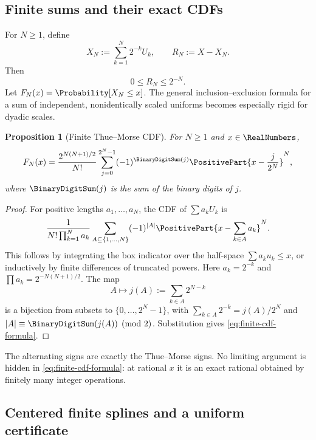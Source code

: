 \documentclass[11pt,oneside]{article}
\newtheorem{proposition}[theorem]{Proposition}
\theoremstyle{definition}
\theoremstyle{remark}
\numberwithin{equation}{section}
\begin{document}
\subsection{Finite sums and their exact CDFs}

For $N\ge1$, define
\begin{equation}\label{eq:finite-random-sum}
 X_N:=\sum_{k=1}^{N}2^{-k}U_k,
 \qquad
 R_N:=X-X_N.
\end{equation}
Then
\begin{equation}\label{eq:tail-bound}
 0\le R_N\le2^{-N}.
\end{equation}
Let $F_N(x)=\Probability[X_N\le x]$.  The general inclusion--exclusion formula for a
sum of independent, nonidentically scaled uniforms becomes especially rigid
for dyadic scales.

\begin{proposition}[Finite Thue--Morse CDF]\label{prop:finite-cdf}
For $N\ge1$ and $x\in\RealNumbers$,
\begin{equation}\label{eq:finite-cdf-formula}
 F_N(x)=
 \frac{2^{N(N+1)/2}}{N!}
 \sum_{j=0}^{2^N-1}(-1)^{\BinaryDigitSum(j)}
 \PositivePart{x-\frac{j}{2^N}}^{N},
\end{equation}
where $\BinaryDigitSum(j)$ is the sum of the binary digits of $j$.
\end{proposition}

\begin{proof}
For positive lengths $a_1,\ldots,a_N$, the CDF of
$\sum a_kU_k$ is
\[
 \frac{1}{N!\prod_{k=1}^N a_k}
 \sum_{A\subseteq\{1,\ldots,N\}}(-1)^{|A|}
 \PositivePart{x-\sum_{k\in A}a_k}^{N}.
\]
This follows by integrating the box indicator over the half-space
$\sum a_ku_k\le x$, or inductively by finite differences of truncated powers.
Here $a_k=2^{-k}$ and
$\prod a_k=2^{-N(N+1)/2}$.  The map
\[
 A\longmapsto j(A):=\sum_{k\in A}2^{N-k}
\]
is a bijection from subsets to $\{0,\ldots,2^N-1\}$, with
$\sum_{k\in A}2^{-k}=j(A)/2^N$ and
$|A|\equiv \BinaryDigitSum(j(A))\pmod2$.  Substitution gives
\eqref{eq:finite-cdf-formula}.
\end{proof}

The alternating signs are exactly the Thue--Morse signs.  No limiting
argument is hidden in \eqref{eq:finite-cdf-formula}: at rational $x$ it is an
exact rational obtained by finitely many integer operations.

\subsection{Centered finite splines and a uniform certificate}
\end{document}
